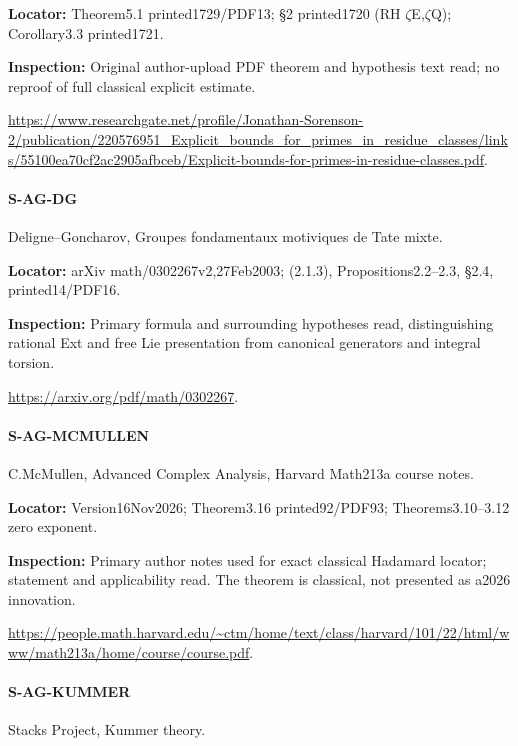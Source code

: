 \documentclass[11pt,a4paper]{article}
\begin{document}
\textbf{Locator:} Theorem5.\allowbreak{}1 printed1729/\allowbreak{}PDF13; §2 printed1720 (RH \ensuremath{\zeta}E,\ensuremath{\zeta}Q); Corollary3.\allowbreak{}3 printed1721.

\textbf{Inspection:} Original author-upload PDF theorem and hypothesis text read; no reproof of full classical explicit estimate.\allowbreak{}

\url{https://www.researchgate.net/profile/Jonathan-Sorenson-2/publication/220576951_Explicit_bounds_for_primes_in_residue_classes/links/55100ea70cf2ac2905afbceb/Explicit-bounds-for-primes-in-residue-classes.pdf}.

\paragraph{S-AG-DG} Deligne–\allowbreak{}Goncharov, Groupes fondamentaux motiviques de Tate mixte.

\textbf{Locator:} arXiv math/\allowbreak{}0302267v2,27Feb2003; (2.\allowbreak{}1.\allowbreak{}3), Propositions2.\allowbreak{}2–\allowbreak{}2.\allowbreak{}3, §2.\allowbreak{}4, printed14/\allowbreak{}PDF16.

\textbf{Inspection:} Primary formula and surrounding hypotheses read, distinguishing rational Ext and free Lie presentation from canonical generators and integral torsion.\allowbreak{}

\url{https://arxiv.org/pdf/math/0302267}.

\paragraph{S-AG-MCMULLEN} C.\allowbreak{}McMullen, Advanced Complex Analysis, Harvard Math213a course notes.

\textbf{Locator:} Version16Nov2026; Theorem3.\allowbreak{}16 printed92/\allowbreak{}PDF93; Theorems3.\allowbreak{}10–\allowbreak{}3.\allowbreak{}12 zero exponent.

\textbf{Inspection:} Primary author notes used for exact classical Hadamard locator; statement and applicability read.\allowbreak{} The theorem is classical, not presented as a2026 innovation.\allowbreak{}

\url{https://people.math.harvard.edu/~ctm/home/text/class/harvard/101/22/html/www/math213a/home/course/course.pdf}.

\paragraph{S-AG-KUMMER} Stacks Project, Kummer theory.
\end{document}
